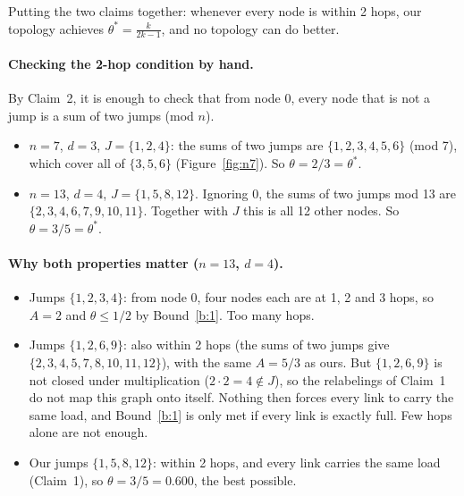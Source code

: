 \documentclass[11pt]{article}
\theoremstyle{definition}
\begin{document}
\noindent Putting the two claims together: whenever every node is within 2 hops, our topology achieves
$\theta^* = \frac{k}{2k-1}$, and no topology can do better.

\paragraph{Checking the 2-hop condition by hand.} By Claim~2, it is enough to check that from node 0, every node
that is not a jump is a sum of two jumps (mod $n$).
\begin{itemize}
\item $n=7$, $d=3$, $J=\{1,2,4\}$: the sums of two jumps are $\{1,2,3,4,5,6\}$ (mod 7), which cover all of $\{3,5,6\}$
  (Figure~\ref{fig:n7}). So $\theta = 2/3 = \theta^*$.
\item $n=13$, $d=4$, $J=\{1,5,8,12\}$. Ignoring $0$, the sums of two jumps mod 13 are $\{2,\allowbreak 3,\allowbreak 4,\allowbreak 6,\allowbreak 7,\allowbreak 9,\allowbreak 10,\allowbreak 11\}$.
  Together with $J$ this is all 12 other nodes. So $\theta = 3/5 = \theta^*$.
\end{itemize}

\paragraph{Why both properties matter ($n=13$, $d=4$).}
\begin{itemize}
\item Jumps $\{1,2,3,4\}$: from node 0, four nodes each are at 1, 2 and 3 hops, so $A = 2$ and $\theta \le 1/2$ by
  Bound~\ref{b:1}. Too many hops.
\item Jumps $\{1,2,6,9\}$: also within 2 hops (the sums of two jumps give $\{2,3,4,5,7,8,10,11,12\}$), with the same
  $A = 5/3$ as ours. But $\{1,2,6,9\}$ is not closed under multiplication ($2\cdot2=4 \notin J$), so the relabelings of
  Claim~1 do not map this graph onto itself. Nothing then forces every link to carry the same load, and Bound~\ref{b:1}
  is only met if every link is exactly full. Few hops alone are not enough.
\item Our jumps $\{1,5,8,12\}$: within 2 hops, and every link carries the same load (Claim~1), so
  $\theta = 3/5 = 0.600$, the best possible.
\end{itemize}
\end{document}
